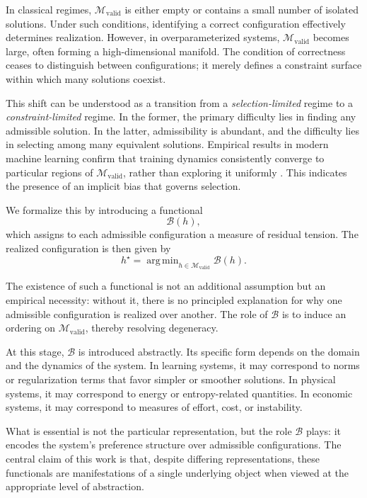 \documentclass[11pt]{article}
\theoremstyle{plain}
\theoremstyle{definition}
\theoremstyle{remark}
\DeclareMathOperator{\argmin}{arg\,min}
\begin{document}
In classical regimes, $\mathcal{M}_{\mathrm{valid}}$ is either empty or contains a small number of isolated solutions. Under such conditions, identifying a correct configuration effectively determines realization. However, in overparameterized systems, $\mathcal{M}_{\mathrm{valid}}$ becomes large, often forming a high-dimensional manifold. The condition of correctness ceases to distinguish between configurations; it merely defines a constraint surface within which many solutions coexist.

This shift can be understood as a transition from a \emph{selection-limited} regime to a \emph{constraint-limited} regime. In the former, the primary difficulty lies in finding any admissible solution. In the latter, admissibility is abundant, and the difficulty lies in selecting among many equivalent solutions. Empirical results in modern machine learning confirm that training dynamics consistently converge to particular regions of $\mathcal{M}_{\mathrm{valid}}$, rather than exploring it uniformly \cite{DubovaSloman2026, Hastie2022}. This indicates the presence of an implicit bias that governs selection.

We formalize this by introducing a functional
\[
\mathcal{B}(h),
\]
which assigns to each admissible configuration a measure of residual tension. The realized configuration is then given by
\[
h^\star = \argmin_{h \in \mathcal{M}_{\mathrm{valid}}} \mathcal{B}(h).
\]

The existence of such a functional is not an additional assumption but an empirical necessity: without it, there is no principled explanation for why one admissible configuration is realized over another. The role of $\mathcal{B}$ is to induce an ordering on $\mathcal{M}_{\mathrm{valid}}$, thereby resolving degeneracy.

At this stage, $\mathcal{B}$ is introduced abstractly. Its specific form depends on the domain and the dynamics of the system. In learning systems, it may correspond to norms or regularization terms that favor simpler or smoother solutions. In physical systems, it may correspond to energy or entropy-related quantities. In economic systems, it may correspond to measures of effort, cost, or instability.

What is essential is not the particular representation, but the role $\mathcal{B}$ plays: it encodes the system's preference structure over admissible configurations. The central claim of this work is that, despite differing representations, these functionals are manifestations of a single underlying object when viewed at the appropriate level of abstraction.
\end{document}

